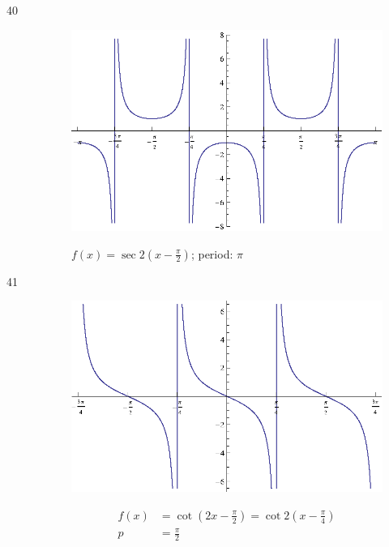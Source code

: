 \documentclass{exam}
\begin{document}
\begin{description}
      \item[40]
        \begin{figure}[H]
          \centering
          \includegraphics[scale=0.9]{exercise40.eps}

          $f(x) = \sec 2 \left( x - \frac{\pi}{2} \right) $; period: $\pi$
        \end{figure}

      \item[41]  
        \begin{figure}[H]
          \centering
          \includegraphics[scale=0.9]{exercise41.eps}

          \begin{align*}
            f(x) & = \cot \left( 2x - \frac{\pi}{2} \right) = \cot 2 \left( x - \frac{\pi}{4} \right) \\
            p    & = \frac{\pi}{2} \\
          \end{align*}
        \end{figure}


\end{description}
\end{document}
